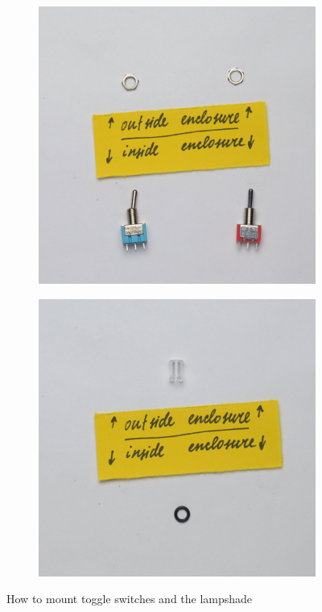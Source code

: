 \documentclass[a4paper,12pt]{article}
\begin{document}
\begin{figure}[h!]
  \centering
  \begin{subfigure}[b]{0.49\textwidth}
    \centering
    \includegraphics[width=\textwidth]{build/06-sw-mount-1000px.jpg}
  \end{subfigure}
  \begin{subfigure}[b]{0.49\textwidth}
    \centering
    \includegraphics[width=\textwidth]{build/07-lampshade-mount-1000px.jpg}
  \end{subfigure}
  \caption{How to mount toggle switches and the lampshade}
\end{figure}
\end{document}
